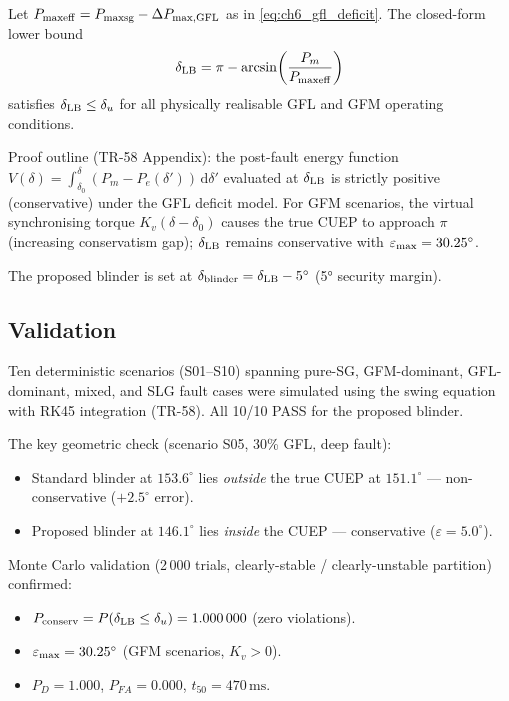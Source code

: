 \begin{proposition}
\label{prop:ch6_cuep}
Let $P_{\rm maxeff} = P_{\rm maxsg} - \Delta P_{\rm max,GFL}$ as in
\eqref{eq:ch6_gfl_deficit}.  The closed-form lower bound
\begin{equation}
  \delta_{\rm LB} = \pi - \arcsin\!\left(\frac{P_m}{P_{\rm maxeff}}\right)
  \label{eq:ch6_delta_lb}
\end{equation}
satisfies $\delta_{\rm LB} \leq \delta_u$ for all physically realisable
GFL and GFM operating conditions.
\end{proposition}

\noindent Proof outline (TR-58 Appendix): the post-fault energy function
$V(\delta) = \int_{\delta_0}^{\delta}(P_m - P_e(\delta'))\,\mathrm{d}\delta'$
evaluated at $\delta_{\rm LB}$ is strictly positive (conservative) under the
GFL deficit model.
For GFM scenarios, the virtual synchronising torque $K_v(\delta - \delta_0)$
causes the true CUEP to approach $\pi$ (increasing conservatism gap);
$\delta_{\rm LB}$ remains conservative with $\varepsilon_{\rm max} = 30.25^\circ$.

The proposed blinder is set at $\delta_{\rm blinder} = \delta_{\rm LB} - 5^\circ$
(5° security margin).

\subsection{Validation}
\label{sec:ch6_relay78_val}

Ten deterministic scenarios (S01--S10) spanning pure-SG, GFM-dominant,
GFL-dominant, mixed, and SLG fault cases were simulated using the swing
equation with RK45 integration (TR-58).  All 10/10 PASS for the proposed
blinder.

The key geometric check (scenario S05, 30\% GFL, deep fault):
\begin{itemize}
  \item Standard blinder at $153.6^\circ$ lies \emph{outside} the true
    CUEP at $151.1^\circ$ — non-conservative ($+2.5^\circ$ error).
  \item Proposed blinder at $146.1^\circ$ lies \emph{inside} the CUEP
    — conservative ($\varepsilon = 5.0^\circ$).
\end{itemize}

Monte Carlo validation (2\,000 trials, clearly-stable / clearly-unstable
partition) confirmed:
\begin{itemize}
  \item $P_{\rm conserv} = P(\delta_{\rm LB} \leq \delta_u) = 1.000\,000$
    (zero violations).
  \item $\varepsilon_{\rm max} = 30.25^\circ$ (GFM scenarios, $K_v > 0$).
  \item $P_D = 1.000$, $P_{FA} = 0.000$, $t_{50} = 470\,\text{ms}$.
\end{itemize}


